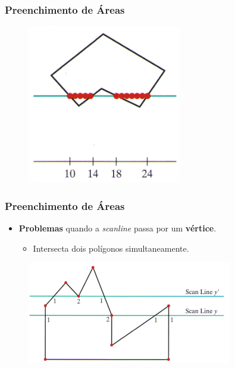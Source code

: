 \documentclass{beamer}
\begin{document}
\begin{frame}
\frametitle{Preenchimento de Áreas}

		\begin{figure}[!h]
			\begin{center}
				\includegraphics[width=0.6\textwidth]{Figures/ScaLin}
			\end{center}
		\end{figure}
	
\end{frame}

\begin{frame}
\frametitle{Preenchimento de Áreas}

	\begin{block}{}
		\begin{itemize}
			\item \textbf{Problemas} quando a \textit{scanline} passa por um \textbf{vértice}.
			\begin{itemize}
				\item Intersecta dois polígonos simultaneamente.
			\end{itemize}
		\end{itemize}
	\end{block}

		\begin{figure}[!h]
			\begin{center}
				\includegraphics[width=0.8\textwidth]{Figures/ScaLinPro}
			\end{center}
		\end{figure}
	
\end{frame}
\end{document}
